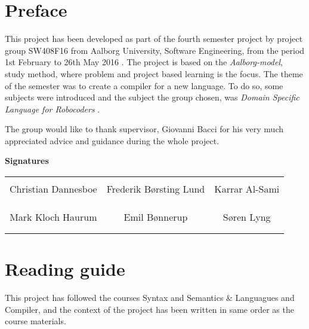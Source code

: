 \chapter*{Preface}
This project has been developed as part of the fourth semester project by project group SW408F16 from Aalborg University, Software Engineering, from the period 1st February to 26th May 2016 . \newline
The project is based on the \textit{Aalborg-model}, study method, where problem and project based learning is the focus. The theme of the semester was to create a compiler for a new language. To do so, some subjects were introduced and the subject the group chosen, was \textit{Domain Specific Language for Robocoders }. \newline

The group would like to thank supervisor, Giovanni Bacci for his very much appreciated advice and guidance during the whole project. 
\newline
\newline
\newline
\newline

{\Huge\textbf{Signatures}}
\newline
\newline

\begin{table}[H]
	\centering
		\begin{tabular}{c c c}
			\underline{\phantom{mmmmmmmmmmmmmm}} & \underline{\phantom{mmmmmmmmmmmmmm}} & \underline{\phantom{mmmmmmmmmmmmmm}} \\
			Christian Dannesboe			& Frederik Børsting Lund 		& Karrar Al-Sami 			\\
			&&\\
			&&\\
			\underline{\phantom{mmmmmmmmmmmmmm}} & \underline{\phantom{mmmmmmmmmmmmmm}} & \underline{\phantom{mmmmmmmmmmmmmm}} \\
			Mark Kloch Haurum			& Emil Bønnerup 		& Søren Lyng 				\\
			&&\\
			&&\\
		 																		
		\end{tabular}
\end{table}

\chapter*{Reading guide}
This project has followed the courses Syntax and Semantics \& Languagues and Compiler, and the context of the project has been written in same order as the course materials. \newline

